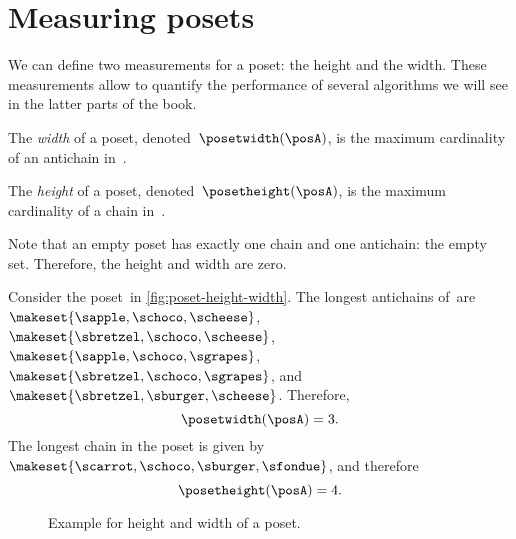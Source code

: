 
\section{Measuring posets}
We can define two measurements for a poset: the height and the width.
These measurements allow to quantify the performance of several algorithms we will see in the latter parts of the book.
\begin{definition}
    \label{def:poset-width}
    The \emph{width} of a poset, denoted~$\posetwidth(\posA)$, is the maximum cardinality of an antichain in~\posA.
\end{definition}

\begin{definition}
    \label{def:poset-height}
    The \emph{height} of a poset, denoted~$\posetheight(\posA)$, is the maximum cardinality of a chain in~\posA.
\end{definition}

Note that an empty poset has exactly one chain and one antichain: the empty set.
Therefore, the height and width are zero.

\begin{example}
    Consider the poset~\posA in \cref{fig:poset-height-width}.
    The longest antichains of~\posA are~$\makeset{\sapple, \schoco, \scheese}$, $\makeset{\sbretzel, \schoco, \scheese}$, $\makeset{\sapple, \schoco, \sgrapes}$, $\makeset{\sbretzel, \schoco, \sgrapes}$, and~$\makeset{\sbretzel, \sburger, \scheese}$.
    Therefore,
    \begin{equation}\label{eq:poset-height-width-1}
        \posetwidth(\posA)=3.
    \end{equation}
    The longest chain in the poset is given by~$\makeset{\scarrot,\schoco,\sburger,\sfondue}$, and therefore
    \begin{equation}\label{eq:poset-height-width-2}
        \posetheight(\posA)=4.
    \end{equation}
\end{example}

\begin{figure*}[h]
    \caption{Example for height and width of a poset.
    }
\end{figure*}

